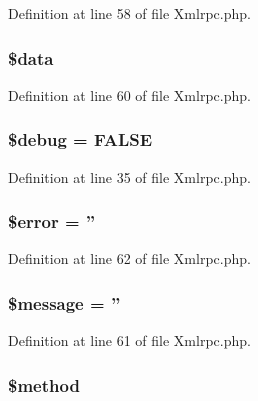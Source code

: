 Definition at line 58 of file Xmlrpc.\-php.

\hypertarget{class_c_i___xmlrpc_a6efc15b5a2314dd4b5aaa556a375c6d6}{
\subsubsection[{\$data}]{\setlength{\rightskip}{0pt plus 5cm}\$data}}\label{class_c_i___xmlrpc_a6efc15b5a2314dd4b5aaa556a375c6d6}


Definition at line 60 of file Xmlrpc.\-php.

\hypertarget{class_c_i___xmlrpc_a85ae3e64cd40e9564adceb010085e9dd}{
\subsubsection[{\$debug}]{\setlength{\rightskip}{0pt plus 5cm}\$debug = F\-A\-L\-S\-E}}\label{class_c_i___xmlrpc_a85ae3e64cd40e9564adceb010085e9dd}


Definition at line 35 of file Xmlrpc.\-php.

\hypertarget{class_c_i___xmlrpc_aeba2ab722cedda53dbb7ec1a59f45550}{
\subsubsection[{\$error}]{\setlength{\rightskip}{0pt plus 5cm}\$error = ''}}\label{class_c_i___xmlrpc_aeba2ab722cedda53dbb7ec1a59f45550}


Definition at line 62 of file Xmlrpc.\-php.

\hypertarget{class_c_i___xmlrpc_abf17cb2dba2ed17cb28aa5f37deb5293}{
\subsubsection[{\$message}]{\setlength{\rightskip}{0pt plus 5cm}\$message = ''}}\label{class_c_i___xmlrpc_abf17cb2dba2ed17cb28aa5f37deb5293}


Definition at line 61 of file Xmlrpc.\-php.

\hypertarget{class_c_i___xmlrpc_a12661b2fc0f57f97e30a1620889ce9c6}{
\subsubsection[{\$method}]{\setlength{\rightskip}{0pt plus 5cm}\${\bf method}}}\label{class_c_i___xmlrpc_a12661b2fc0f57f97e30a1620889ce9c6}


